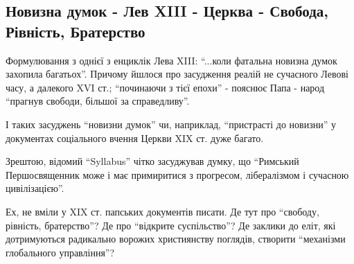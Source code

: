  
 
 
 
 

\subsection{Новизна думок - Лев XIII - Церква - Свобода, Рівність, Братерство}
\label{sec:15_04_2021.fb.zagrebelnyj_igor.1.papa_svoboda_osuzhdenie_chelovek}

Формулювання з однієї з енциклік Лева XIII: \enquote{...коли фатальна новизна думок
захопила багатьох}. Причому йшлося про засудження реалій не сучасного Левові
часу, а далекого XVI ст.; \enquote{починаючи з тієї епохи} - пояснює Папа - народ
\enquote{прагнув свободи, більшої за справедливу}. 

І таких засуджень \enquote{новизни думок} чи, наприклад, \enquote{пристрасті до
новизни} у документах соціального вчення Церкви XIX ст. дуже багато.

Зрештою, відомий \enquote{Syllabus} чітко засуджував думку, що 
\enquote{Римський Першосвященник може і має примиритися з прогресом, лібералізмом і сучасною цивілізацією}.

Ех, не вміли у XIX ст. папських документів писати. Де тут про \enquote{свободу,
рівність, братерство}? Де про \enquote{відкрите суспільство}? Де заклики до
еліт, які дотримуються радикально ворожих християнству поглядів, створити
\enquote{механізми глобального управління}?
